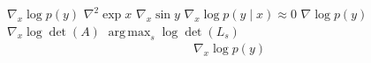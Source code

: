 \documentclass{article}
\begin{document}
$\nabla_{x}\log p(y)$ $\nabla^{2}\exp x$ $\nabla_{x}\sin y$ $\nabla_{x}\log p(y\mid x)\approx 0$ $\nabla\log p(y)$
$\nabla_{x}\log\det(A)$ $\operatorname*{arg\,max}_{s}\log\det(L_{s})$
\[\begin{split}\nabla_{x}\log p(y)\end{split}\]
\end{document}
